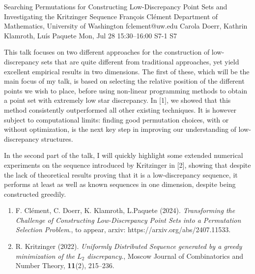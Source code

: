\begin{talk}
  {Searching Permutations for Constructing Low-Discrepancy Point Sets and Investigating the Kritzinger Sequence}%
  {Fran\c{c}ois Cl\'{e}ment}%
  {Department of Mathematics, University of Washington}%
  {fclement@uw.edu}%
  {Carola Doerr, Kathrin Klamroth, Lu\'is Paquete}%
  {}%
  {Mon, Jul 28 15:30--16:00}%
  {S7-1}%
  {S7}%
  
    
   
This talk focuses on two different approaches for the construction of low-discrepancy sets that are quite different from traditional approaches, yet yield excellent empirical results in two dimensions. The first of these, which will be the main focus of my talk, is based on selecting the relative position of the different points we wish to place, before using non-linear programming methods to obtain a point set with extremely low star discrepancy. In [1], we showed that this method consistently outperformed all other existing techniques. It is however subject to computational limits: finding good permutation choices, with or without optimization, is the next key step in improving our understanding of low-discrepancy structures.

In the second part of the talk, I will quickly highlight some extended numerical experiments on the sequence introduced by Kritzinger in [2], showing that despite the lack of theoretical results proving that it is a low-discrepancy sequence, it performs at least as well as known sequences in one dimension, despite being constructed greedily. 

\medskip

\begin{enumerate}
 \item[{[1]}] F. Cl\'ement, C. Doerr, K. Klamroth, L.Paquete (2024). {\it Transforming the Challenge of Constructing Low-Discrepancy Point Sets into a Permutation Selection Problem}., to appear, arxiv: https://arxiv.org/abs/2407.11533.
 \item[{[2]}] R. Kritzinger (2022).  {\it Uniformly Distributed Sequence generated by a greedy minimization of the $L_2$ discrepancy}., Moscow Journal of Combinatorics and Number Theory, \textbf{11}(2), 215--236.
\end{enumerate}

\end{talk}

